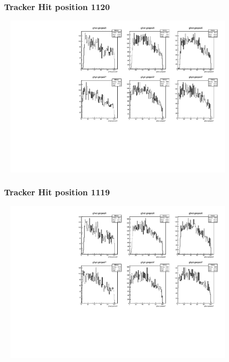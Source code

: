 \documentclass[slidestop,compress,mathserif]{beamer}
\begin{document}
\begin{frame}\frametitle{Tracker Hit position 1120}
	 \includegraphics[width=12cm,height=8cm]{Tracker_Hit_position_1120.pdf}
\end{frame}
\begin{frame}\frametitle{Tracker Hit position 1119}
	 \includegraphics[width=12cm,height=8cm]{Tracker_Hit_position_1119.pdf}
\end{frame}
\end{document}
